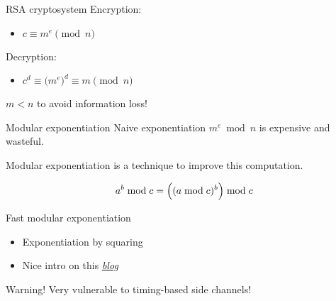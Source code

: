 \begin{frame}{RSA cryptosystem}
  Encryption:
  \pause
  \begin{itemize}
    \item $c \equiv m^e \pmod{n}$
  \end{itemize}

  \pause
  Decryption:
  \pause
  \begin{itemize}
    \item $c^d \equiv \bigl(m^e\bigr)^d \equiv m \pmod{n}$
  \end{itemize}

  \vspace*{1em}

  \pause
  $m < n$ to avoid information loss!
\end{frame}

\begin{frame}{Modular exponentiation}
  Naive exponentiation $m^e \bmod n$ is expensive and wasteful.

  \pause
  Modular exponentiation is a technique to improve this computation.

  \pause
  \[
    a^b \bmod c = \Bigl((a \bmod c)^b\Bigr) \bmod c
  \]

  \pause
  Fast modular exponentiation
  \begin{itemize}[<+(1)->]
    \item Exponentiation by squaring
    \item Nice intro on this \href{https://dev-notes.eu/2019/12/Fast-Modular-Exponentiation/}{\textit{blog}}
  \end{itemize}

  \pause
  \begin{block}{Warning!}
    Very vulnerable to timing-based side channels!
  \end{block}
  
\end{frame}

